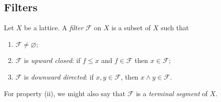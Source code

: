 \subsection{Filters}
\begin{definition}
    Let \( X \) be a lattice.
    A \emph{filter} \( \mathcal F \) on \( X \) is a subset of \( X \) such that
    \begin{enumerate}
        \item \( \mathcal F \neq \varnothing \);
        \item \( \mathcal F \) is \emph{upward closed}: if \( f \leq x \) and \( f \in \mathcal F \) then \( x \in \mathcal F \);
        \item \( \mathcal F \) is \emph{downward directed}: if \( x, y \in \mathcal F \), then \( x \wedge y \in \mathcal F \).
    \end{enumerate}
\end{definition}
For property (ii), we might also say that \( \mathcal F \) is a \emph{terminal segment} of \( X \).
